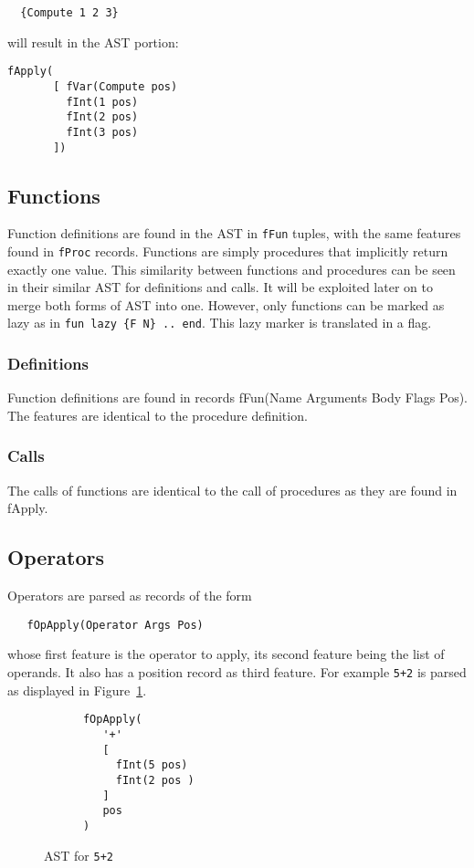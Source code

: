\documentclass[a4paper]{memoir}
\begin{document}
\begin{lstlisting}
  {Compute 1 2 3}
\end{lstlisting}

will result in the AST portion:
\begin{lstlisting}
fApply(
       [ fVar(Compute pos)
         fInt(1 pos)
         fInt(2 pos)
         fInt(3 pos)
       ])
\end{lstlisting}

\subsection{Functions}\label{sec:input:functions}
Function definitions are found in the AST in \lstinline!fFun! tuples, with the
same features found in \lstinline!fProc! records. Functions are simply
procedures that implicitly return exactly one value. This similarity between
functions and procedures can be seen in their similar AST for definitions and
calls. It will be exploited later on to merge both forms of AST
into one.
However, only functions can be marked as lazy as in \lstinline!fun lazy {F N} .. end!. This lazy marker is translated in a flag.
\subsubsection{Definitions}
Function definitions are found in records fFun(Name Arguments Body Flags Pos). The features are identical to the procedure definition.
\subsubsection{Calls}
The calls of functions are identical to the call of procedures as they are found in fApply.

\subsection{Operators}\label{sec:input:operators}
Operators are parsed as records of the form
\begin{lstlisting}
   fOpApply(Operator Args Pos)
\end{lstlisting}
 whose first feature is the operator to
apply, its second feature being the list of operands. It also has a position
record as third feature. For example
\lstinline!5+2! is parsed as displayed in Figure~\ref{fig:opexample}.
\begin{figure}[h]
\begin{lstlisting}
      fOpApply(
         '+'
         [
           fInt(5 pos)
           fInt(2 pos )
         ]
         pos
      )
\end{lstlisting}
\caption{AST for \lstinline!5+2!}
\label{fig:opexample}
\end{figure}
\end{document}
